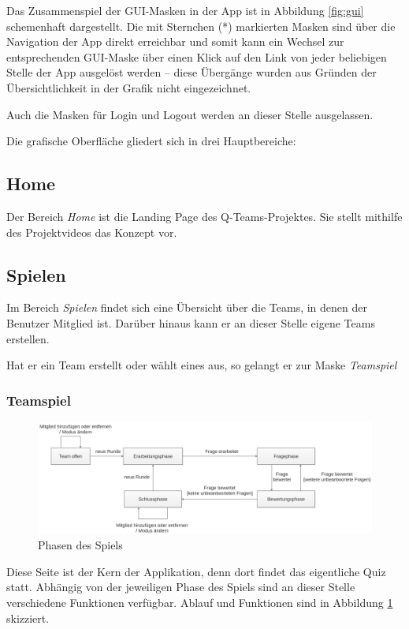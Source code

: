 \documentclass[a4paper,11pt,listof=numbered,glossary=totoc,parskip=half,toc=bib]{scrreprt}
\begin{document}
	Das Zusammenspiel der GUI-Masken in der App ist in Abbildung \ref{fig:gui} schemenhaft dargestellt. Die mit Sternchen (*) markierten Masken sind über die Navigation der App direkt erreichbar und somit kann ein Wechsel zur entsprechenden GUI-Maske über einen Klick auf den Link von jeder beliebigen Stelle der App ausgelöst werden -- diese Übergänge wurden aus Gründen der Übersichtlichkeit in der Grafik nicht eingezeichnet.
	
	Auch die Masken für Login und Logout werden an dieser Stelle ausgelassen.
	
	Die grafische Oberfläche gliedert sich in drei Hauptbereiche:
		
	\subsection{Home}
	Der Bereich \textit{Home} ist die Landing Page des Q-Teams-Projektes. Sie stellt mithilfe des Projektvideos das Konzept vor.

	\subsection{Spielen}
	Im Bereich \textit{Spielen} findet sich eine Übersicht über die Teams, in denen der Benutzer Mitglied ist. Darüber hinaus kann er an dieser Stelle eigene Teams erstellen.
	
	Hat er ein Team erstellt oder wählt eines aus, so gelangt er zur Maske \textit{Teamspiel}
	
	\subsubsection{Teamspiel}	

	\begin{figure}
		\centering
		\includegraphics[width=\textwidth]{ablauf}
		\caption{Phasen des Spiels}
		\label{fig:phasen}
	\end{figure}
		
	Diese Seite ist der Kern der Applikation, denn dort findet das eigentliche Quiz statt. Abhängig von der jeweiligen Phase des Spiels sind an dieser Stelle verschiedene Funktionen verfügbar. Ablauf und Funktionen sind in Abbildung \ref{fig:phasen} skizziert.
	
\end{document}
